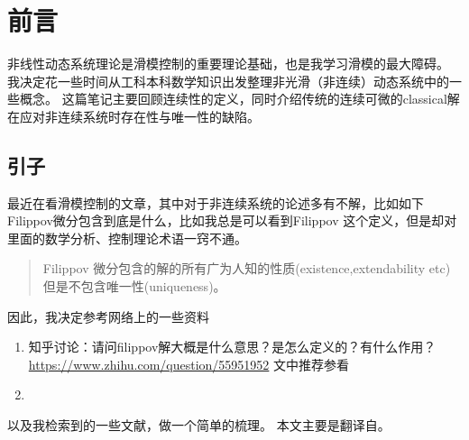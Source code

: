 \chapter{前言}

非线性动态系统理论是滑模控制的重要理论基础，也是我学习滑模的最大障碍。
我决定花一些时间从工科本科数学知识出发整理非光滑（非连续）动态系统中的一些概念。
这篇笔记主要回顾连续性的定义，同时介绍传统的连续可微的classical解在应对非连续系统时存在性与唯一性的缺陷。

\section{引子}

最近在看滑模控制的文章，其中对于非连续系统的论述多有不解，比如如下Filippov微分包含到底是什么，比如我总是可以看到Filippov 这个定义，但是却对里面的数学分析、控制理论术语一窍不通。
\begin{quote}
  Filippov 微分包含的解的所有广为人知的性质(existence,extendability
  etc)但是不包含唯一性(uniqueness)。
\end{quote}
因此，我决定参考网络上的一些资料
\begin{enumerate}
  \item
    知乎讨论：请问filippov解大概是什么意思？是怎么定义的？有什么作用？
    \url{https://www.zhihu.com/question/55951952} 文中推荐参看\cite{cortesDiscontinuousDynamicalSystems2008,hanTheoryControlSystems2016}
  \item
\end{enumerate}
以及我检索到的一些文献，做一个简单的梳理。
本文主要是翻译自\cite{cortesDiscontinuousDynamicalSystems2008}。






